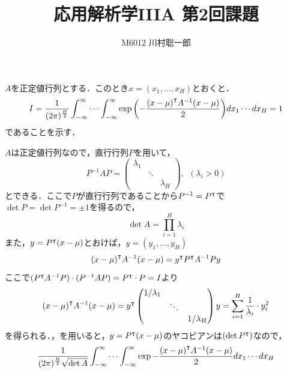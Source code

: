 \documentclass[dvipdfmx]{jsreport}
\title{応用解析学IIIA 第2回課題}
\author{M6012 川村聡一郎}
\date{}
\begin{document}
\maketitle

\begin{tcolorbox}
    $A$を正定値行列とする．このとき$x= (x_1, \ldots, x_H)$とおくと．
\begin{equation*}
    I= \frac{1}{(2\pi)^\frac{H}{2}}\int_{-\infty}^\infty\cdots \int_{-\infty}^\infty \exp{\left(-\frac{{(x- \mu)}^\intercal A^{-1}(x- \mu)}{2}\right)}dx_1\cdots dx_H= 1
\end{equation*}
    であることを示す．
\end{tcolorbox}

\begin{souanswer}
    $A$は正定値行列なので，直行行列$P$を用いて，
\begin{equation*}
    P^{-1}AP= 
\begin{pmatrix}
    \lambda_1& & \\
    & \ddots& \\
    & & \lambda_H
\end{pmatrix},\ \ (\lambda_i> 0)
\end{equation*}    
    とできる．ここで$P$が直行行列であることから$P^{-1}= {P}^\intercal$で$\det{P}= \det{P^{-1}}= \pm 1$を得るので，
\begin{equation} \label{eq:detの定義}
    \det{A}= \prod_{i= 1}^H \lambda_i
\end{equation}
    また，$y= {P}^\intercal(x- \mu)$とおけば，$y= (y_1, \ldots, y_H)$
\begin{equation*}
    {(x- \mu)}^\intercal A^{-1}(x- \mu)= {y}^\intercal{P}^\intercal A^{-1}Py
\end{equation*}
    ここで$({P}^\intercal A^{-1}P)\cdot (P^{-1}AP)= {P}^\intercal\cdot P= I$より
\begin{align} \label{eq:行列をyで挟む}
    {(x- \mu)}^\intercal A^{-1}(x- \mu)
    = {y}^\intercal
    \begin{pmatrix}
    1/\lambda_1& & \\
    & \ddots& \\
    & & 1/\lambda_H
    \end{pmatrix}
    y
    = \sum_{i= 1}^H \frac{1}{\lambda_i}\cdot y^2_i
\end{align}
    を得られる．，を用いると，$y= {P}^\intercal(x- \mu)$のヤコビアンは$(\det{{P}^\intercal})$なので，
\begin{align*}
\begin{split}
    \frac{1}{(2\pi)^\frac{H}{2}\sqrt{\det{A}}}\int_{-\infty}^\infty\cdots \int_{-\infty}^\infty \exp{-\frac{\tr{(x- \mu)}A^{-1}(x- \mu)}{2}}dx_1\cdots dx_H\\

\end{split}
\end{align*}
\end{souanswer}
\end{document}
